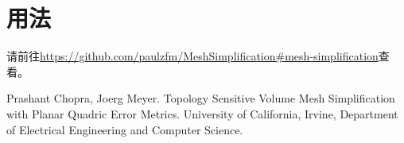 \documentclass[11pt, a4paper]{article}
\begin{document}
\section{用法}

请前往\url{https://github.com/paulzfm/MeshSimplification#mesh-simplification}查看。

\begin{thebibliography}{99}
     Prashant Chopra, Joerg Meyer. Topology Sensitive Volume Mesh Simplification with Planar Quadric Error Metrics. University of California, Irvine, Department of Electrical Engineering and Computer Science.
\end{thebibliography}
\end{document}
